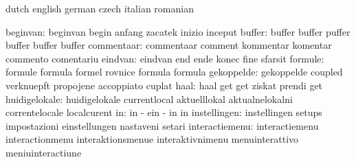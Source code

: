 \stopsetupvariables




\startelements             dutch                     english
                           german                    czech
                           italian                   romanian

                 beginvan: beginvan                  begin
                           anfang                    zacatek
                           inizio                    inceput
                   buffer: buffer                    buffer
                           puffer                    buffer
                           buffer                    buffer
               commentaar: commentaar                comment
                           kommentar                 komentar
                           commento                  comentariu
                  eindvan: eindvan                   end
                           ende                      konec
                           fine                      sfarsit
                  formule: formule                   formula
                           formel                    rovnice
                           formula                   formula
               gekoppelde: gekoppelde                coupled
                           verknuepft                propojene
                           accoppiato                cuplat
                     haal: haal                      get
                           get                       ziskat
                           prendi                    get
            huidigelokale: huidigelokale             currentlocal
                           aktuelllokal              aktualnelokalni
                           correntelocale            localcurent
                       in: in                        -
                           ein                       -
                           in                        in
             instellingen: instellingen              setups
                           impostazioni              einstellungen
                           nastaveni                 setari
           interactiemenu: interactiemenu            interactionmenu
                           interaktionsmenue         interaktivnimenu
                           menuinterattivo           meniuinteractiune
